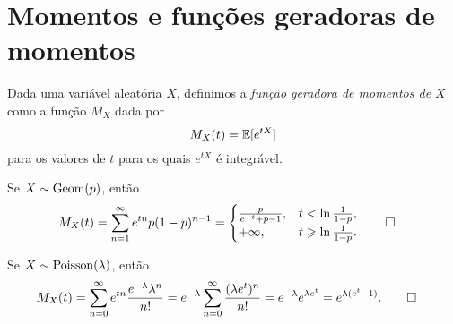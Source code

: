 \clearpage
\section{Momentos e funções geradoras de momentos}

\begin{definition}
Dada uma variável aleatória $ X $, definimos a \emph{função geradora de momentos de $ X $} como a função $ M_X $ dada por
\[
M_X(t) = \E[e^{tX}]
\]
para os valores de $ t $ para os quais $ e^{tX} $ é integrável.
\end{definition}

\begin{example}
[Geométrica]
Se $X\sim \Geom(p)$, então
\begin{align*}
M_{X}(t)
&=
\sum_{n=1}^{\infty} e^{tn} p (1-p)^{n-1}
=
\begin{cases}
\frac{p}{e^{-t} + p-1}, & t < \ln \tfrac{1}{1-p},
\\
+\infty, & t \geq \ln \tfrac{1}{1-p}.
\end{cases}
\qedhere
\end{align*}
\end{example}

\begin{example}
[Poisson]
\label{exem:fgPoisson}
Se $X\sim \Poisson(\lambda )$, então
\begin{align*}
M_{X}(t) &
=
\sum_{n=0}^{\infty} e^{tn} \frac{e^{-\lambda} \lambda^n}{n!}
=
e^{-\lambda} \sum_{n=0}^{\infty} \frac{(\lambda e^t)^n}{n!}
=
e^{-\lambda} e^{\lambda e^t}
=
e^{\lambda (e^{t}-1)}
.
\qedhere
\end{align*}
\end{example}

